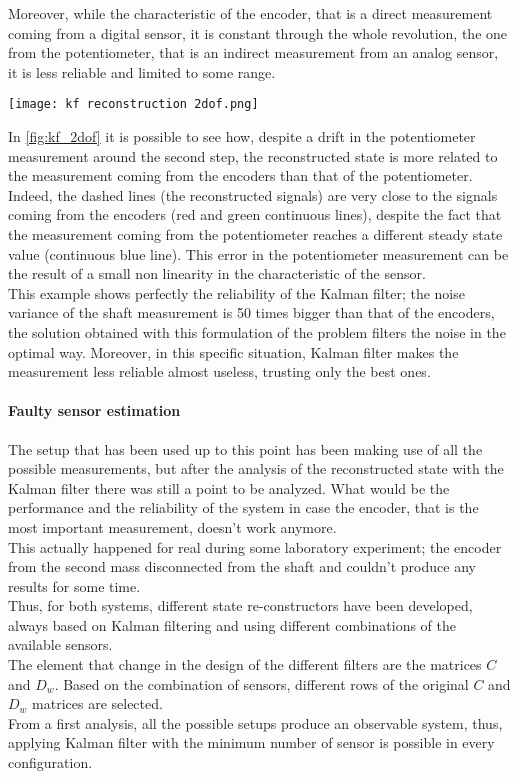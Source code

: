 Moreover, while the characteristic of the encoder, that is a direct measurement coming from a digital sensor, it is constant through the whole revolution, the one from the potentiometer, that is an indirect measurement from an analog sensor, it is less reliable and limited to some range. 
\begin{figure*}[h]
	\centering
	\texttt{[image: kf reconstruction 2dof.png]}
	\caption{Kalman filter reconstruction compared with available measurements}
	\label{fig:kf_2dof}
\end{figure*}
In \cref{fig:kf_2dof} it is possible to see how, despite a drift in the potentiometer measurement around the second step, the reconstructed state is more related to the measurement coming from the encoders than that of the potentiometer. Indeed, the dashed lines (the reconstructed signals) are very close to the signals coming from the encoders (red and green continuous lines), despite the fact that the measurement coming from the potentiometer reaches a different steady state value (continuous blue line). This error in the potentiometer measurement can be the result of a small non linearity in the characteristic of the sensor. \\

This example shows perfectly the reliability of the Kalman filter; the noise variance of the shaft measurement is 50 times bigger than that of the encoders, the solution obtained with this formulation of the problem filters the noise in the optimal way. Moreover, in this specific situation, Kalman filter makes the measurement less reliable almost useless, trusting only the best ones. 

\paragraph{Faulty sensor estimation}
The setup that has been used up to this point has been making use of all  the possible measurements, but after the analysis of the reconstructed state with the Kalman filter there was still a point to be analyzed. What would be the performance and the reliability of the system in case the encoder, that is the most important measurement, doesn't work anymore. \\
This actually happened for real during some laboratory experiment; the encoder from the second mass disconnected from the shaft and couldn't produce any results for some time. \\ 

Thus, for both systems, different state re-constructors have been developed, always based on Kalman filtering and using different combinations of the available sensors. \\
The element that change in the design of the different filters are the matrices $C$ and $D_w$. Based on the combination of sensors, different rows of the original $C$ and $D_w$ matrices are selected. \\
From a first analysis, all the possible setups produce an observable system, thus, applying Kalman filter with the minimum number of sensor is possible in every configuration. \\

